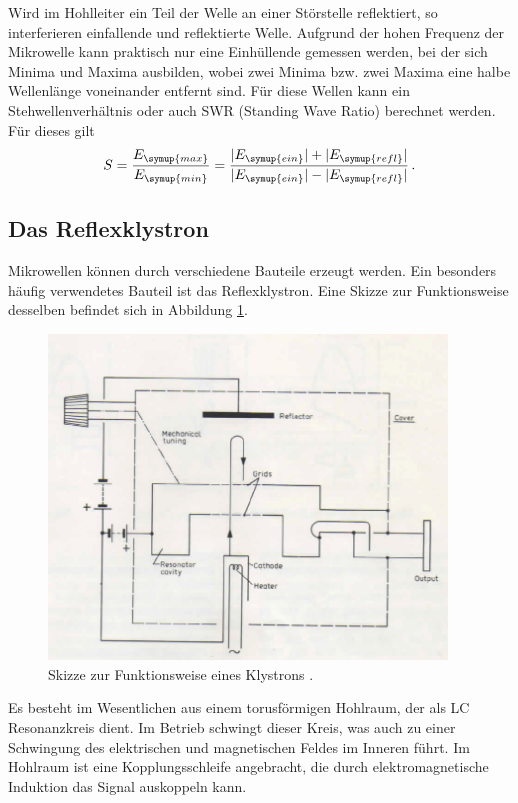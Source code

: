 Wird im Hohlleiter ein Teil der Welle an einer Störstelle reflektiert, so interferieren
einfallende und reflektierte Welle. Aufgrund der hohen Frequenz der Mikrowelle kann praktisch nur eine
Einhüllende gemessen werden, bei der sich Minima und Maxima ausbilden,
wobei zwei Minima bzw. zwei Maxima eine halbe Wellenlänge voneinander entfernt
sind. Für diese Wellen kann ein Stehwellenverhältnis oder auch SWR (Standing Wave
Ratio) berechnet werden. Für dieses gilt
\begin{equation}
  S=\frac{E_{\symup{max}}}{E_{\symup{min}}}=\frac{|E_{\symup{ein}}|+|E_{\symup{refl}}|}
  {|E_{\symup{ein}}|-|E_{\symup{refl}}|}\,.
\end{equation}


\subsection{Das Reflexklystron}
\label{subsec:klystron}
Mikrowellen können durch verschiedene Bauteile erzeugt werden. Ein besonders häufig
verwendetes Bauteil ist das Reflexklystron. Eine Skizze zur Funktionsweise desselben
befindet sich in Abbildung \ref{fig:klystron}.

\begin{figure}
  \centering
  \includegraphics[width=300pt]{data/klystron.png}
  \caption{Skizze zur Funktionsweise eines Klystrons \cite{Versuchsanleitung_alt}.}
  \label{fig:klystron}
\end{figure}

Es besteht im Wesentlichen aus einem torusförmigen Hohlraum, der als LC Resonanzkreis
dient. Im Betrieb schwingt dieser Kreis, was auch zu einer Schwingung des elektrischen
und magnetischen Feldes im Inneren führt. Im Hohlraum ist eine Kopplungsschleife
angebracht, die durch elektromagnetische Induktion das Signal auskoppeln kann.

